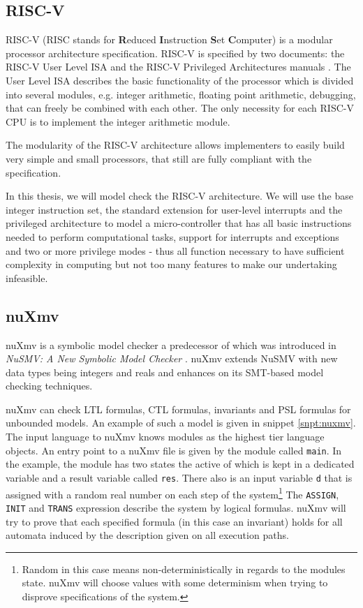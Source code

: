 \documentclass{article}
\begin{document}
\subsection{RISC-V}

RISC-V (RISC stands for \textbf{R}educed \textbf{I}nstruction \textbf{S}et \textbf{C}omputer) is a modular processor architecture specification.
RISC-V is specified by two documents: the RISC-V User Level ISA \cite{RiscVISA} and the RISC-V Privileged Architectures manuals \cite{RiscVISAP}.
The User Level ISA describes the basic functionality of the processor which is divided into several modules, e.g. integer arithmetic, floating point arithmetic, debugging, that can freely be combined with each other.
The only necessity for each RISC-V CPU is to implement the integer arithmetic module.

The modularity of the RISC-V architecture allows implementers to easily build very simple and small processors, that still are fully compliant with the specification.

In this thesis, we will model check the RISC-V architecture.
We will use the base integer instruction set, the standard extension for user-level interrupts and the privileged architecture to model a micro-controller that has all basic instructions needed to perform computational tasks, support for interrupts and exceptions and two or more privilege modes - thus all function necessary to have sufficient complexity in computing but not too many features to make our undertaking infeasible.

\subsection{nuXmv}

nuXmv \cite{Cavada14} is a symbolic model checker a predecessor of which was introduced in \textit{NuSMV: A New Symbolic Model Checker} \cite{Cimatti2000}.
nuXmv extends NuSMV with new data types being integers and reals and enhances on its SMT-based model checking techniques.

nuXmv can check LTL formulas, CTL formulas, invariants and PSL formulas for unbounded models.
An example of such a model is given in snippet \ref{snpt:nuxmv}.
The input language to nuXmv knows modules as the highest tier language objects.
An entry point to a nuXmv file is given by the module called \texttt{main}.
In the example, the module has two states the active of which is kept in a dedicated variable and a result variable called \texttt{res}.
There also is an input variable \texttt{d} that is assigned with a random real number on each step of the system\footnote{%
    Random in this case means non-deterministically in regards to the modules state.
    nuXmv will choose values with some determinism when trying to disprove specifications of the system.
}
The \texttt{ASSIGN}, \texttt{INIT} and \texttt{TRANS} expression describe the system by logical formulas.
nuXmv will try to prove that each specified formula (in this case an invariant) holds for all automata induced by the description given on all execution paths.
\end{document}

